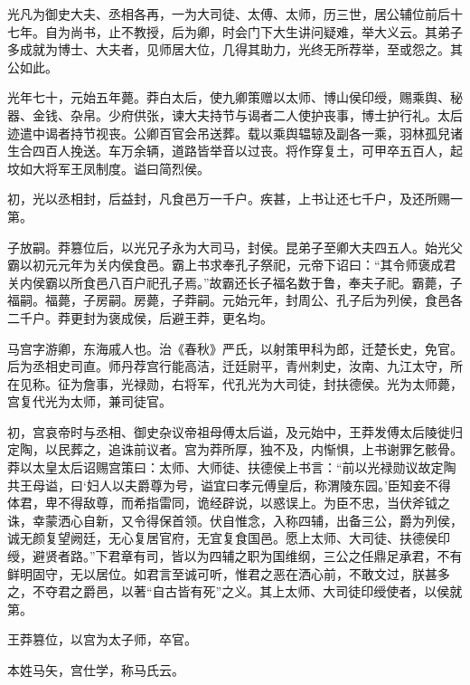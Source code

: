 \documentclass[12pt,UTF8]{ctexbook}
\begin{document}
光凡为御史大夫、丞相各再，一为大司徒、太傅、太师，历三世，居公辅位前后十七年。自为尚书，止不教授，后为卿，时会门下大生讲问疑难，举大义云。其弟子多成就为博士、大夫者，见师居大位，几得其助力，光终无所荐举，至或怨之。其公如此。



光年七十，元始五年薨。莽白太后，使九卿策赠以太师、博山侯印绶，赐乘舆、秘器、金钱、杂帛。少府供张，谏大夫持节与谒者二人使护丧事，博士护行礼。太后迹遣中谒者持节视丧。公卿百官会吊送葬。载以乘舆辒辌及副各一乘，羽林孤兒诸生合四百人挽送。车万余辆，道路皆举音以过丧。将作穿复土，可甲卒五百人，起坟如大将军王凤制度。谥曰简烈侯。



初，光以丞相封，后益封，凡食邑万一千户。疾甚，上书让还七千户，及还所赐一第。



子放嗣。莽篡位后，以光兄子永为大司马，封侯。昆弟子至卿大夫四五人。始光父霸以初元元年为关内侯食邑。霸上书求奉孔子祭祀，元帝下诏曰：“其令师褒成君关内侯霸以所食邑八百户祀孔子焉。”故霸还长子福名数于鲁，奉夫子祀。霸薨，子福嗣。福薨，子房嗣。房薨，子莽嗣。元始元年，封周公、孔子后为列侯，食邑各二千户。莽更封为褒成侯，后避王莽，更名均。



马宫字游卿，东海戚人也。治《春秋》严氏，以射策甲科为郎，迁楚长史，免官。后为丞相史司直。师丹荐宫行能高洁，迁廷尉平，青州刺史，汝南、九江太守，所在见称。征为詹事，光禄勋，右将军，代孔光为大司徒，封扶德侯。光为太师薨，宫复代光为太师，兼司徒官。



初，宫哀帝时与丞相、御史杂议帝祖母傅太后谥，及元始中，王莽发傅太后陵徙归定陶，以民葬之，追诛前议者。宫为莽所厚，独不及，内惭惧，上书谢罪乞骸骨。莽以太皇太后诏赐宫策曰：太师、大师徒、扶德侯上书言：“前以光禄勋议故定陶共王母谥，曰‘妇人以夫爵尊为号，谥宜曰孝元傅皇后，称渭陵东园。’臣知妾不得体君，卑不得敌尊，而希指雷同，诡经辟说，以惑误上。为臣不忠，当伏斧钺之诛，幸蒙洒心自新，又令得保首领。伏自惟念，入称四辅，出备三公，爵为列侯，诚无颜复望阙廷，无心复居官府，无宜复食国邑。愿上太师、大司徒、扶德侯印绶，避贤者路。”下君章有司，皆以为四辅之职为国维纲，三公之任鼎足承君，不有鲜明固守，无以居位。如君言至诚可听，惟君之恶在洒心前，不敢文过，朕甚多之，不夺君之爵邑，以著“自古皆有死”之义。其上太师、大司徒印绶使者，以侯就第。



王莽篡位，以宫为太子师，卒官。



本姓马矢，宫仕学，称马氏云。
\end{document}
